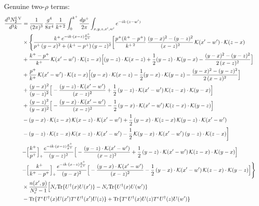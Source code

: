 \documentclass[9pt]{article}
\numberwithin{equation}{section}
\begin{document}
Genuine two-$\rho$ terms:
\begin{align}
\frac{d^{3}N^{\rm I.V}_{2}}{d^{3}k} & =\frac{1}{(2\pi)^{3}}\,\frac{g^{4}}{8\pi^{4}}\,\frac{1}{k^{+\,2}}\int_{0}^{k^{+}}\frac{dp^{+}}{2\pi}\int_{x,y,z,x',w'}e^{-ik\cdot{(z-w')}}\notag\\
&\times\Bigg\{\frac{k^{+}\,e^{-ik\cdot{(x-z)}\frac{p^{+}}{k^{+}}}}{p^{+}\,(y-x)^{2}+(k^{+}-p^{+})\,(y-z)^{2}}\bigg[\frac{p^{+}(k^{+}-p^{+})}{k^{+\,2}}\,\frac{(y-x)^{2}-(y-z)^{2}}{(x-z)^{2}}\,\mathcal{K}(x'-w')\cdot\mathcal{K}(z-x)\notag\\
&+\frac{k^{+}-p^{+}}{k^{+}}\,\mathcal{K}(x'-w')\cdot\mathcal{K}(z-x)\Big[(y-z)\cdot\mathcal{K}(x-z)+\frac{1}{2}(y-z)\cdot\mathcal{K}(y-x)-\frac{(y-x)^{2}-(y-z)^{2}}{2\,(x-z)^{2}}\Big]\notag\\
&+\frac{p^{+}}{k^{+}}\,\mathcal{K}(x'-w')\cdot\mathcal{K}(z-x)\Big[(y-x)\cdot\mathcal{K}(x-z)-\frac{1}{2}(y-x)\cdot\mathcal{K}(y-z)-\frac{(y-x)^{2}-(y-z)^{2}}{2\,(x-z)^{2}}\Big]\notag\\
&+\frac{(y-x)^{2}}{(y-z)^{2}}\Big[-\frac{(y-z)\cdot\mathcal{K}(x'-w')}{(x-z)^{2}}+\frac{1}{2}\,(y-z)\cdot\mathcal{K}(x'-w')\,\mathcal{K}(z-x)\cdot\mathcal{K}(y-x)\Big]\notag\\
&+\frac{(y-z)^{2}}{(y-x)^{2}}\Big[-\frac{(y-x)\cdot\mathcal{K}(x'-w')}{(x-z)^{2}}-\frac{1}{2}\,(y-x)\cdot\mathcal{K}(x'-w')\,\mathcal{K}(z-x)\cdot\mathcal{K}(y-z)\Big]\notag\\
&-(y-x)\cdot\mathcal{K}(z-x)\,\mathcal{K}(x-z)\cdot\mathcal{K}(x'-w')+\frac{1}{2}\,(y-x)\cdot\mathcal{K}(z-x)\,\mathcal{K}(y-z)\cdot\mathcal{K}(x'-w')\notag\\
&-(y-z)\cdot\mathcal{K}(z-x)\,\mathcal{K}(x-z)\cdot\mathcal{K}(x'-w')-\frac{1}{2}\,\mathcal{K}(y-x)\cdot\mathcal{K}(x'-w')\,(y-z)\cdot\mathcal{K}(z-x)\bigg]\notag\\
&{-\Big[\frac{k^{+}}{p^{+}}\Big]_{+}\frac{e^{-ik\cdot{(x-z)}\frac{p^{+}}{k^{+}}}}{(y-z)^{2}}\Big[-\frac{(y-z)\cdot\mathcal{K}(x'-w')}{(x-z)^{2}}+\frac{1}{2}\,(y-z)\cdot\mathcal{K}(x'-w')\,\mathcal{K}(z-x)\cdot\mathcal{K}(y-x)\Big]}\notag\\
&{-\Big[\frac{k^{+}}{k^{+}-p^{+}}\Big]_{+}\frac{e^{-ik\cdot{(x-z)}\frac{p^{+}}{k^{+}}}}{(y-x)^{2}}\Big[-\frac{(y-x)\cdot\mathcal{K}(x'-w')}{(x-z)^{2}}-\frac{1}{2}\,(y-x)\cdot\mathcal{K}(x'-w')\,\mathcal{K}(z-x)\cdot\mathcal{K}(y-z)\Big]}\Bigg\}\notag\\
&\times\frac{n(x',y)}{N_{c}^{2}-1}\Big[N_{c}{\rm Tr}\{U^{\dagger}(x)U(x')\}-N_{c}{\rm Tr}\{U^{\dagger}(x)U(w')\}\notag\\ &-{\rm Tr}\{T^{e}U^{\dagger}(x)U(x')T^{e}U^{\dagger}(x')U(z)\}+{\rm Tr}\{T^{e}U^{\dagger}(x)U(z)T^{e}U^{\dagger}(z)U(w')\}\notag\\

\end{align}
\end{document}
